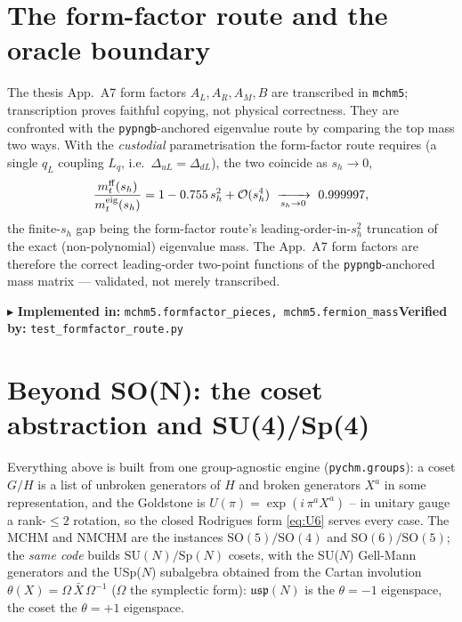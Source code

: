 \documentclass[11pt]{article}
\newcommand{\SO}[1]{\mathrm{SO}(#1)}
\newcommand{\SU}[1]{\mathrm{SU}(#1)}
\newcommand{\Sp}[1]{\mathrm{Sp}(#1)}
\newcommand{\sh}{s_h}
\newcommand{\code}[1]{\texttt{#1}}
\newcommand{\impl}[2]{\par\smallskip\noindent\textcolor{blue!60!black}{\small$\blacktriangleright$ \textbf{Implemented in:} \code{#1}\quad\textbf{Verified by:} \code{#2}}\par\smallskip}
\begin{document}
\section{The form-factor route and the oracle boundary}
\label{sec:ff}
The thesis App.~A7 form factors $A_L,A_R,A_M,B$ are transcribed in \code{mchm5}; transcription
proves faithful copying, not physical correctness. They are confronted with the
\code{pypngb}-anchored eigenvalue route by comparing the top mass two ways. With the
\emph{custodial} parametrisation the form-factor route requires (a single $q_L$ coupling $L_q$,
i.e.\ $\Delta_{uL}=\Delta_{dL}$), the two coincide as $\sh\to0$,
\begin{equation}
  \frac{m_t^{\rm ff}(\sh)}{m_t^{\rm eig}(\sh)}=1-0.755\,\sh^2+\mathcal O(\sh^4)\ \xrightarrow[\sh\to0]{}\ 0.999997,
\end{equation}
the finite-$\sh$ gap being the form-factor route's leading-order-in-$\sh^2$ truncation of the exact
(non-polynomial) eigenvalue mass. The App.~A7 form factors are therefore the correct
leading-order two-point functions of the \code{pypngb}-anchored mass matrix --- validated, not
merely transcribed.
\impl{mchm5.formfactor\_pieces, mchm5.fermion\_mass}{test\_formfactor\_route.py}

\section{Beyond SO(N): the coset abstraction and SU(4)/Sp(4)}
\label{sec:coset}
Everything above is built from one group-agnostic engine (\code{pychm.groups}): a coset $G/H$ is a
list of unbroken generators of $H$ and broken generators $X^a$ in some representation, and the
Goldstone is $U(\pi)=\exp(i\,\pi^a X^a)$ -- in unitary gauge a rank-$\le2$ rotation, so the closed
Rodrigues form \eqref{eq:U6} serves every case. The MCHM and NMCHM are the instances
$\SO5/\SO4$ and $\SO6/\SO5$; the \emph{same code} builds $\SU N/\Sp N$ cosets, with the SU($N$)
Gell-Mann generators and the USp($N$) subalgebra obtained from the Cartan involution
$\theta(X)=\Omega\,\bar X\,\Omega^{-1}$ ($\Omega$ the symplectic form): $\mathfrak{usp}(N)$ is the
$\theta=-1$ eigenspace, the coset the $\theta=+1$ eigenspace.
\end{document}
